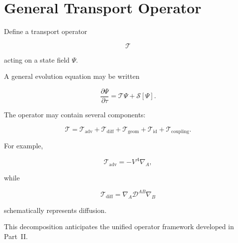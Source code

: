 \documentclass[12pt,oneside]{book}
\begin{document}

\section{General Transport Operator}
\label{sec:general-transport-operator}

Define a transport operator

\begin{equation}
    \mathcal{T}
\end{equation}

acting on a state field \(\Psi\).

A general evolution equation may be written

\begin{equation}
    \frac{\partial\Psi}{\partial\tau}
    =
    \mathcal{T}\Psi
    +
    \mathcal{S}[\Psi].
    \label{eq:general-transport-evolution}
\end{equation}

The operator may contain several components:

\begin{equation}
    \mathcal{T}
    =
    \mathcal{T}_{\mathrm{adv}}
    +
    \mathcal{T}_{\mathrm{diff}}
    +
    \mathcal{T}_{\mathrm{geom}}
    +
    \mathcal{T}_{\mathrm{id}}
    +
    \mathcal{T}_{\mathrm{coupling}}.
    \label{eq:transport-operator-decomposition}
\end{equation}

For example,

\begin{equation}
    \mathcal{T}_{\mathrm{adv}}
    =
    -V^A\nabla_A,
\end{equation}

while

\begin{equation}
    \mathcal{T}_{\mathrm{diff}}
    =
    \nabla_A
    \mathcal{D}^{AB}
    \nabla_B
\end{equation}

schematically represents diffusion.

This decomposition anticipates the unified operator framework
developed in Part~II.

\end{document}
